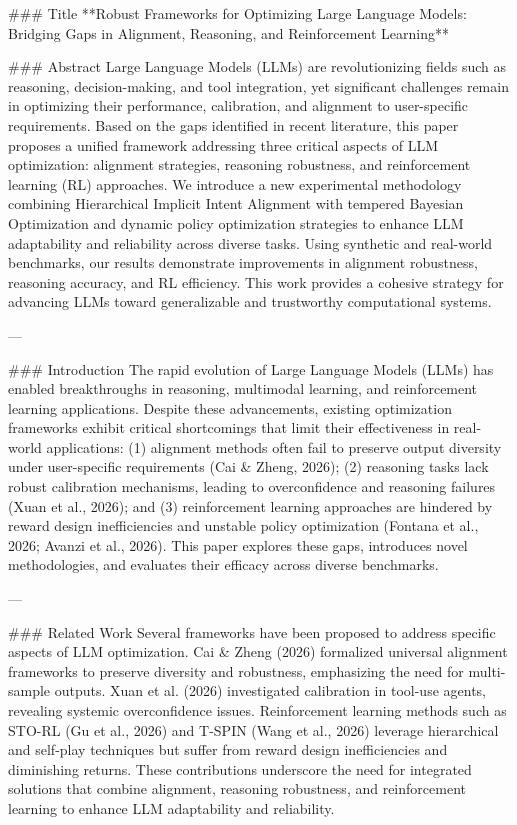 ### Title
**Robust Frameworks for Optimizing Large Language Models: Bridging Gaps in Alignment, Reasoning, and Reinforcement Learning**

### Abstract
Large Language Models (LLMs) are revolutionizing fields such as reasoning, decision-making, and tool integration, yet significant challenges remain in optimizing their performance, calibration, and alignment to user-specific requirements. Based on the gaps identified in recent literature, this paper proposes a unified framework addressing three critical aspects of LLM optimization: alignment strategies, reasoning robustness, and reinforcement learning (RL) approaches. We introduce a new experimental methodology combining Hierarchical Implicit Intent Alignment with tempered Bayesian Optimization and dynamic policy optimization strategies to enhance LLM adaptability and reliability across diverse tasks. Using synthetic and real-world benchmarks, our results demonstrate improvements in alignment robustness, reasoning accuracy, and RL efficiency. This work provides a cohesive strategy for advancing LLMs toward generalizable and trustworthy computational systems.

---

### Introduction
The rapid evolution of Large Language Models (LLMs) has enabled breakthroughs in reasoning, multimodal learning, and reinforcement learning applications. Despite these advancements, existing optimization frameworks exhibit critical shortcomings that limit their effectiveness in real-world applications: (1) alignment methods often fail to preserve output diversity under user-specific requirements (Cai & Zheng, 2026); (2) reasoning tasks lack robust calibration mechanisms, leading to overconfidence and reasoning failures (Xuan et al., 2026); and (3) reinforcement learning approaches are hindered by reward design inefficiencies and unstable policy optimization (Fontana et al., 2026; Avanzi et al., 2026). This paper explores these gaps, introduces novel methodologies, and evaluates their efficacy across diverse benchmarks.

---

### Related Work
Several frameworks have been proposed to address specific aspects of LLM optimization. Cai & Zheng (2026) formalized universal alignment frameworks to preserve diversity and robustness, emphasizing the need for multi-sample outputs. Xuan et al. (2026) investigated calibration in tool-use agents, revealing systemic overconfidence issues. Reinforcement learning methods such as STO-RL (Gu et al., 2026) and T-SPIN (Wang et al., 2026) leverage hierarchical and self-play techniques but suffer from reward design inefficiencies and diminishing returns. These contributions underscore the need for integrated solutions that combine alignment, reasoning robustness, and reinforcement learning to enhance LLM adaptability and reliability.

